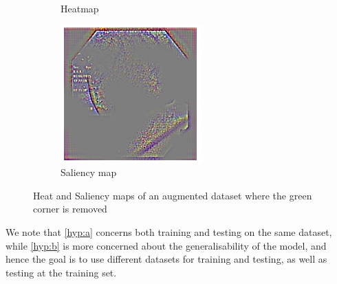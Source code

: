 \begin{figure}
\begin{subfigure}[t]{0.3\textwidth}
         \caption{Heatmap}
         \label{fig:sal5}
     \end{subfigure}     
     \hfill
     \begin{subfigure}[t]{0.3\textwidth}
         \centering
         \includegraphics[width=\textwidth]{methodology/figures/sal7.png}
         \caption{Saliency map}
         \label{fig:sal7}
     \end{subfigure}
     \caption{Heat and Saliency maps of an augmented dataset where the green corner is removed}
     \label{fig:Saliencymasks2}
\end{figure}



We note that \ref{hyp:a} concerns both training and testing on the same dataset, while \ref{hyp:b} is more concerned about the generalisability of the model, and hence the goal is to use different datasets for training and testing, as well as testing at the training set. 





